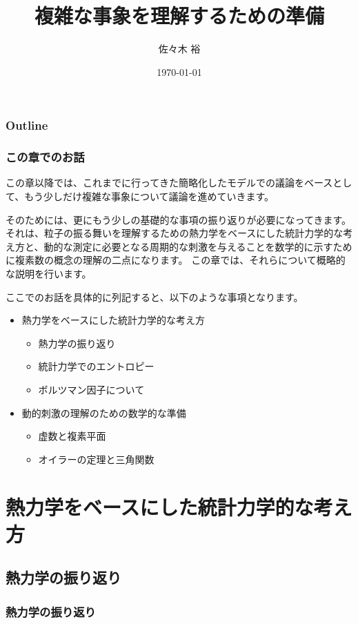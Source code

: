 \documentclass[12pt, dvipdfmx]{beamer}
\title
[複雑な事象を理解するための準備]
{複雑な事象を理解するための準備}
\author[東亞合成　佐々木]{佐々木 裕}
\institute[東亞合成]{東亞合成株式会社}
\date{\today}
\begin{document}
\maketitle

\begin{frame}
\frametitle{Outline}
\tableofcontents
\end{frame}

\begin{frame}
	\frametitle{この章でのお話}
	この章以降では、これまでに行ってきた簡略化したモデルでの議論をベースとして、もう少しだけ複雑な事象について議論を進めていきます。

	そのためには、更にもう少しの基礎的な事項の振り返りが必要になってきます。
	それは、粒子の振る舞いを理解するための熱力学をベースにした統計力学的な考え方と、動的な測定に必要となる周期的な刺激を与えることを数学的に示すために複素数の概念の理解の二点になります。
	この章では、それらについて概略的な説明を行います。
	
	ここでのお話を具体的に列記すると、以下のような事項となります。
	\begin{boxnote}
		\begin{itemize}
			\item 熱力学をベースにした統計力学的な考え方
			\begin{itemize}
				\item 熱力学の振り返り
				\item 統計力学でのエントロピー
				\item ボルツマン因子について
			\end{itemize}
			\item 動的刺激の理解のための数学的な準備
			\begin{itemize}
				\item 虚数と複素平面
				\item オイラーの定理と三角関数
			\end{itemize}
		\end{itemize}
	\end{boxnote}
	
\end{frame}

\section{熱力学をベースにした統計力学的な考え方}
\subsection{熱力学の振り返り}
\begin{frame}
	\frametitle{熱力学の振り返り}

\end{frame}
\end{document}
